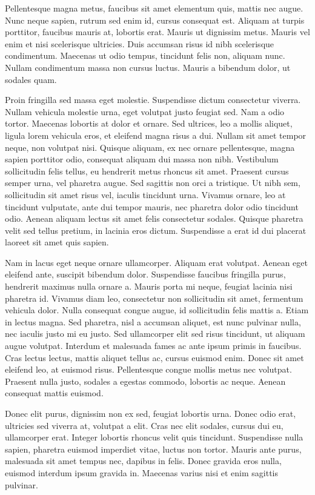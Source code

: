 \documentclass{homework}
\begin{document}
Pellentesque magna metus, faucibus sit amet elementum quis, mattis nec augue. Nunc neque sapien, rutrum sed enim id, cursus consequat est. Aliquam at turpis porttitor, faucibus mauris at, lobortis erat. Mauris ut dignissim metus. Mauris vel enim et nisi scelerisque ultricies. Duis accumsan risus id nibh scelerisque condimentum. Maecenas ut odio tempus, tincidunt felis non, aliquam nunc. Nullam condimentum massa non cursus luctus. Mauris a bibendum dolor, ut sodales quam.

Proin fringilla sed massa eget molestie. Suspendisse dictum consectetur viverra. Nullam vehicula molestie urna, eget volutpat justo feugiat sed. Nam a odio tortor. Maecenas lobortis at dolor et ornare. Sed ultrices, leo a mollis aliquet, ligula lorem vehicula eros, et eleifend magna risus a dui. Nullam sit amet tempor neque, non volutpat nisi. Quisque aliquam, ex nec ornare pellentesque, magna sapien porttitor odio, consequat aliquam dui massa non nibh. Vestibulum sollicitudin felis tellus, eu hendrerit metus rhoncus sit amet. Praesent cursus semper urna, vel pharetra augue. Sed sagittis non orci a tristique. Ut nibh sem, sollicitudin sit amet risus vel, iaculis tincidunt urna. Vivamus ornare, leo at tincidunt vulputate, ante dui tempor mauris, nec pharetra dolor odio tincidunt odio. Aenean aliquam lectus sit amet felis consectetur sodales. Quisque pharetra velit sed tellus pretium, in lacinia eros dictum. Suspendisse a erat id dui placerat laoreet sit amet quis sapien.

Nam in lacus eget neque ornare ullamcorper. Aliquam erat volutpat. Aenean eget eleifend ante, suscipit bibendum dolor. Suspendisse faucibus fringilla purus, hendrerit maximus nulla ornare a. Mauris porta mi neque, feugiat lacinia nisi pharetra id. Vivamus diam leo, consectetur non sollicitudin sit amet, fermentum vehicula dolor. Nulla consequat congue augue, id sollicitudin felis mattis a. Etiam in lectus magna. Sed pharetra, nisl a accumsan aliquet, est nunc pulvinar nulla, nec iaculis justo mi eu justo. Sed ullamcorper elit sed risus tincidunt, ut aliquam augue volutpat. Interdum et malesuada fames ac ante ipsum primis in faucibus. Cras lectus lectus, mattis aliquet tellus ac, cursus euismod enim. Donec sit amet eleifend leo, at euismod risus. Pellentesque congue mollis metus nec volutpat. Praesent nulla justo, sodales a egestas commodo, lobortis ac neque. Aenean consequat mattis euismod.

Donec elit purus, dignissim non ex sed, feugiat lobortis urna. Donec odio erat, ultricies sed viverra at, volutpat a elit. Cras nec elit sodales, cursus dui eu, ullamcorper erat. Integer lobortis rhoncus velit quis tincidunt. Suspendisse nulla sapien, pharetra euismod imperdiet vitae, luctus non tortor. Mauris ante purus, malesuada sit amet tempus nec, dapibus in felis. Donec gravida eros nulla, euismod interdum ipsum gravida in. Maecenas varius nisi et enim sagittis pulvinar.
\end{document}
